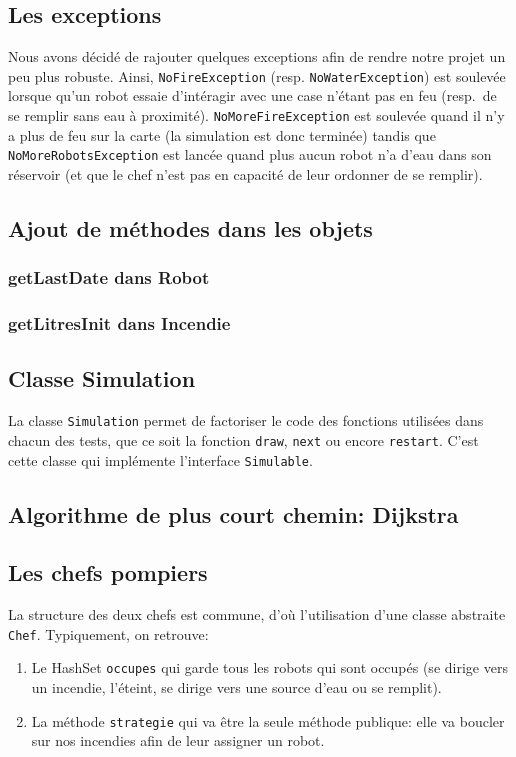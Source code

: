 \documentclass[a4paper,8pt]{article} %
\begin{document}
\subsection{Les exceptions}

Nous avons décidé de rajouter quelques exceptions afin de rendre notre projet un peu plus robuste. 
Ainsi, {\tt NoFireException} (resp. {\tt NoWaterException}) est soulevée lorsque qu'un robot essaie d'intéragir avec une case n'étant pas en feu (resp.\ de se remplir sans eau à proximité).
{\tt NoMoreFireException} est soulevée quand il n'y a plus de feu sur la carte (la simulation est donc terminée) tandis que {\tt NoMoreRobotsException} est lancée quand plus aucun robot n'a d'eau dans son réservoir (et que le chef n'est pas en capacité de leur ordonner de se remplir).

\subsection{Ajout de méthodes dans les objets}
\subsubsection{getLastDate dans Robot}
\subsubsection{getLitresInit dans Incendie}
\subsection{Classe Simulation}

La classe {\tt Simulation} permet de factoriser le code des fonctions utilisées dans chacun des tests, que ce soit la fonction {\tt draw}, {\tt next} ou encore {\tt restart}.
C'est cette classe qui implémente l'interface {\tt Simulable}.

\subsection{Algorithme de plus court chemin: Dijkstra}
\subsection{Les chefs pompiers}
La structure des deux chefs est commune, d'où l'utilisation d'une classe abstraite \texttt{Chef}. Typiquement, on retrouve:
\begin{enumerate}
    \item Le HashSet \texttt{occupes} qui garde tous les robots qui sont occupés (se dirige vers un incendie, l'éteint,
    se dirige vers une source d'eau ou se remplit).
    \item La méthode \texttt{strategie} qui va être la seule méthode publique: elle va boucler sur nos incendies afin de leur assigner un robot.
\end{enumerate}
\end{document}
